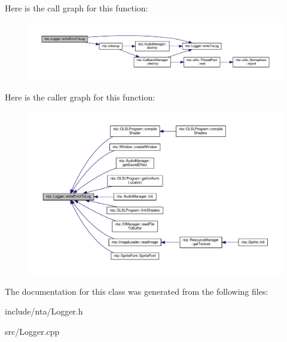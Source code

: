 Here is the call graph for this function\+:
\nopagebreak
\begin{figure}[H]
\begin{center}
\leavevmode
\includegraphics[width=350pt]{d6/d0d/classnta_1_1Logger_a08299f1414203eba74b306ce6712192e_cgraph}
\end{center}
\end{figure}
Here is the caller graph for this function\+:
\nopagebreak
\begin{figure}[H]
\begin{center}
\leavevmode
\includegraphics[width=350pt]{d6/d0d/classnta_1_1Logger_a08299f1414203eba74b306ce6712192e_icgraph}
\end{center}
\end{figure}


The documentation for this class was generated from the following files\+:\begin{DoxyCompactItemize}
\item 
include/nta/Logger.\+h\item 
src/Logger.\+cpp\end{DoxyCompactItemize}
